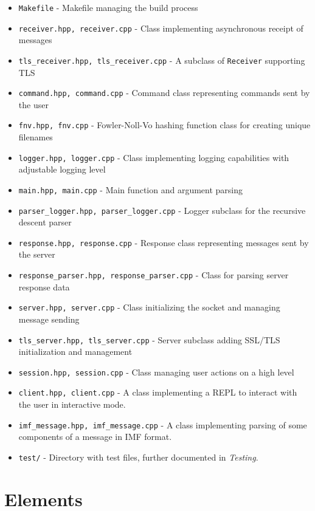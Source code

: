 \documentclass[a4]{report}
\begin{document}
\begin{itemize}
\item \texttt{Makefile} - Makefile managing the build process
\item \texttt{receiver.hpp, receiver.cpp} - Class implementing asynchronous receipt of messages
\item \texttt{tls\_receiver.hpp, tls\_receiver.cpp} - A subclass of \texttt{Receiver} supporting TLS
\item \texttt{command.hpp, command.cpp} - Command class representing commands sent by the user
\item \texttt{fnv.hpp, fnv.cpp} - Fowler-Noll-Vo\cite{eastlake-fnv-29} hashing function class for creating unique filenames
\item \texttt{logger.hpp, logger.cpp} - Class implementing logging capabilities with adjustable logging level
\item \texttt{main.hpp, main.cpp} - Main function and argument parsing
\item \texttt{parser\_logger.hpp, parser\_logger.cpp} - Logger subclass for the recursive descent parser
\item \texttt{response.hpp, response.cpp} - Response class representing messages sent by the server
\item \texttt{response\_parser.hpp, response\_parser.cpp} - Class for parsing server response data
\item \texttt{server.hpp, server.cpp} - Class initializing the socket and managing message sending
\item \texttt{tls\_server.hpp, tls\_server.cpp} - Server subclass adding SSL/TLS initialization and management
\item \texttt{session.hpp, session.cpp} - Class managing user actions on a high level
\item \texttt{client.hpp, client.cpp} - A class implementing a REPL to interact with the user in interactive mode.
\item \texttt{imf\_message.hpp, imf\_message.cpp} - A class implementing parsing of some components of a message in IMF format.
\item \texttt{test/} - Directory with test files, further documented in \textit{Testing}.
\end{itemize}

\section{Elements}
\end{document}
